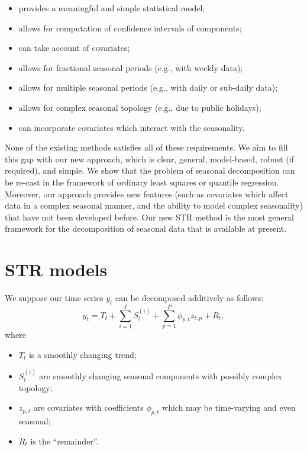 \documentclass[11pt,a4paper,]{article}
\providecommand{\tightlist}{%
  \setlength{\itemsep}{0pt}\setlength{\parskip}{0pt}}
\begin{document}
\begin{itemize}
\tightlist
\item
  provides a meaningful and simple statistical model;
\item
  allows for computation of confidence intervals of components;
\item
  can take account of covariates;
\item
  allows for fractional seasonal periods (e.g., with weekly data);
\item
  allows for multiple seasonal periods (e.g., with daily or sub-daily data);
\item
  allows for complex seasonal topology (e.g., due to public holidays);
\item
  can incorporate covariates which interact with the seasonality.
\end{itemize}

None of the existing methods satisfies all of these requirements. We aim to fill this gap with our new approach, which is clear, general, model-based, robust (if required), and simple. We show that the problem of seasonal decomposition can be re-cast in the framework of ordinary least squares or quantile regression. Moreover, our approach provides new features (such as covariates which affect data in a complex seasonal manner, and the ability to model complex seasonality) that have not been developed before. Our new STR method is the most general framework for the decomposition of seasonal data that is available at present.

\hypertarget{str-models}{%
\section{STR models}\label{str-models}}

We suppose our time series \(y_{t}\) can be decomposed additively as follows:
\begin{equation}
  \label{STR:many_parts}
  y_{t} = T_{t} + \sum_{i=1}^{I} S^{(i)}_{t} + \sum_{p=1}^P \phi_{p,t} z_{t,p} + R_{t} ,
\end{equation}
where

\begin{itemize}
\tightlist
\item
  \(T_{t}\) is a smoothly changing trend;
\item
  \(S^{(i)}_{t}\) are smoothly changing seasonal components with possibly complex topology;
\item
  \(z_{p,t}\) are covariates with coefficients \(\phi_{p,t}\) which may be time-varying and even seasonal;
\item
  \(R_{t}\) is the ``remainder''.
\end{itemize}
\end{document}
